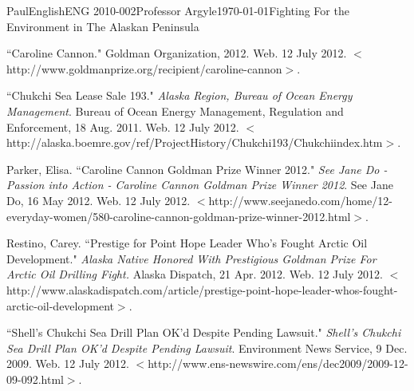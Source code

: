 \documentclass[12pt,letterpaper]{article}
\begin{document}
\begin{mla}{Paul}{English}{ENG 2010-002}{Professor Argyle}{\today}{Fighting For the Environment in The Alaskan Peninsula}
\begin{workscited}

\bibent
``Caroline Cannon." Goldman Organization, 2012. Web. 12 July 2012. $<$http://www.goldmanprize.org/recipient/caroline-cannon$>$.

\bibent
``Chukchi Sea Lease Sale 193." \textit{Alaska Region, Bureau of Ocean Energy Management}. Bureau of Ocean Energy Management, Regulation and Enforcement, 18 Aug. 2011. Web. 12 July 2012. $<$http://alaska.boemre.gov/ref/ProjectHistory/Chukchi193/Chukchiindex.htm$>$.


\bibent
Parker, Elisa. ``Caroline Cannon Goldman Prize Winner 2012." \textit{See Jane Do - Passion into Action - Caroline Cannon Goldman Prize Winner 2012}. See Jane Do, 16 May 2012. Web. 12 July 2012. $<$http://www.seejanedo.com/home/12-everyday-women/580-caroline-cannon-goldman-prize-winner-2012.html$>$.

\bibent 
Restino, Carey. ``Prestige for Point Hope Leader Who's Fought Arctic Oil Development." \textit{Alaska Native Honored With Prestigious Goldman Prize For Arctic Oil Drilling Fight.} Alaska Dispatch, 21 Apr. 2012. Web. 12 July 2012. $<$http://www.alaskadispatch.com/article/prestige-point-hope-leader-whos-fought-arctic-oil-development$>$.

\bibent
``Shell's Chukchi Sea Drill Plan OK'd Despite Pending Lawsuit." \textit{Shell's Chukchi Sea Drill Plan OK'd Despite Pending Lawsuit}. Environment News Service, 9 Dec. 2009. Web. 12 July 2012. $<$http://www.ens-newswire.com/ens/dec2009/2009-12-09-092.html$>$.


\end{workscited}
\end{mla}
\end{document}
